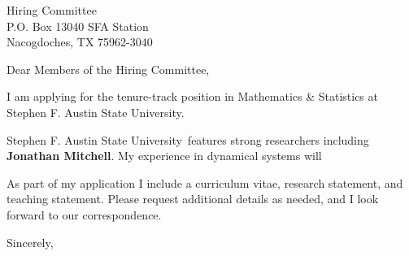 \documentclass[11pt,a4paper]{letter}
\begin{document}
\def\School{Stephen F. Austin State University}
\begin{letter}
{Hiring Committee\\
P.O. Box 13040 SFA Station\\
Nacogdoches, TX 75962-3040}


\opening{Dear Members of the Hiring Committee,}

I am applying for the tenure-track position in Mathematics \& Statistics at \School. 



\School~features strong researchers including \textbf{Jonathan Mitchell}. My experience in dynamical systems will 



As part of my application I include a curriculum vitae, research statement, and teaching statement. Please request additional details as needed, and I look forward to our correspondence.

\closing{Sincerely,}
\end{letter}
\end{document}
